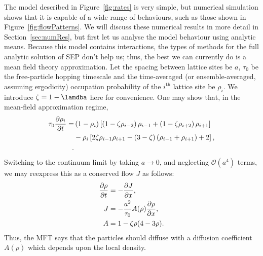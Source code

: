 The model described in Figure~\ref{fig:rates} is very simple, but numerical simulation shows that it is capable of a wide range of behaviours, such as those shown in Figure~\ref{fig:flowPatterns}. We will discuss
these numerical results in more detail in Section~\ref{sec:numRes}, but first let us analyse the model behaviour using analytic means.
Because this model contains interactions, the types of methods for the full analytic solution of SEP don't help us; thus, the best we can currently do is a mean field theory approximation.
Let the spacing between lattice sites be $a$, $\tau_0$ be the free-particle hopping timescale and the time-averaged (or ensemble-averaged, assuming ergodicity) occupation probability of the $i^{\mathrm{th}}$ lattice site be $\rho_i$.
We introduce $\zeta = 1 - \lamdba$ here for convenience.
One may show that, in the mean-field approximation regime,
\begin{align*}
 \tau_0 \frac{\partial \rho_i}{\partial t} = &\left( 1-\rho_i \right) \left[ \left(1-\zeta\rho_{i-2} \right) \rho_{i-1} + \left(1-\zeta\rho_{i+2} \right) \rho_{i+1} \right] \\
 &- \rho_i \left[ 2 \zeta \rho_{i-1} \rho_{i+1}  - (3-\zeta)\left(\rho_{i-1} + \rho_{i+1}\right) + 2 \right],\\.
\end{align*}
Switching to the continuum limit by taking $a\rightarrow 0$, and neglecting $\mathcal{O}(a^4)$ terms, we may reexpress this as a conserved flow $J$ as follows:
\begin{align*}
 \frac{\partial \rho}{\partial t} &= - \frac{\partial J}{\partial x}, \\
 J &= - \frac{a^2}{\tau_0} A(\rho) \frac{\partial \rho}{\partial x}, \\
 A &= 1 - \zeta \rho(4-3\rho). \\
\end{align*}
Thus, the MFT says that the particles should diffuse with a diffusion coefficient $A(\rho)$ which depends upon the local density.
